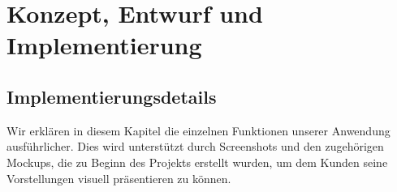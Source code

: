 \chapter{Konzept, Entwurf und Implementierung}
\label{cha:implementierung}

\section{Implementierungsdetails}
\label{sec:implementierung:implementierungsdetails}

Wir erklären in diesem Kapitel die einzelnen Funktionen unserer Anwendung ausführlicher. Dies wird unterstützt durch Screenshots und den zugehörigen Mockups, die zu Beginn des Projekts erstellt wurden, um dem Kunden seine Vorstellungen visuell präsentieren zu können.


